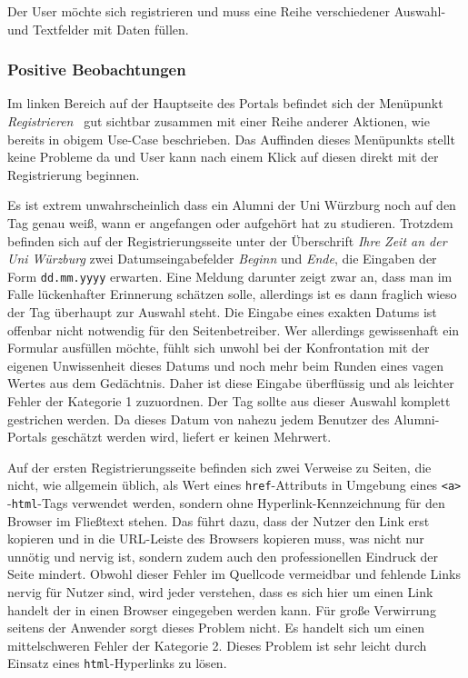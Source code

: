 \newpage
{}\label{usecse:reg}
Der User möchte sich registrieren und muss eine Reihe verschiedener Auswahl- und Textfelder mit Daten füllen.

\subsubsection*{Positive Beobachtungen} 
Im linken Bereich auf der Hauptseite des Portals befindet sich der Menüpunkt \emph{ Registrieren} ~gut sichtbar zusammen mit einer Reihe anderer Aktionen, wie bereits in obigem Use-Case beschrieben. Das Auffinden dieses Menüpunkts stellt keine Probleme da und User kann nach einem Klick auf diesen direkt mit der Registrierung
beginnen.




{ Es ist extrem unwahrscheinlich dass ein Alumni der Uni Würzburg noch auf den Tag genau weiß, wann er angefangen oder aufgehört hat zu studieren. Trotzdem befinden sich auf
der Registrierungsseite unter der Überschrift \emph{Ihre Zeit an der Uni Würzburg} zwei Datumseingabefelder \emph{Beginn} und \emph{Ende}, die Eingaben der Form \texttt{dd.mm.yyyy} erwarten.
}
{
Eine Meldung darunter zeigt zwar an, dass man im Falle lückenhafter Erinnerung schätzen solle, allerdings ist es dann fraglich wieso der Tag überhaupt zur Auswahl steht. Die Eingabe eines exakten Datums ist offenbar nicht notwendig für den Seitenbetreiber. Wer allerdings gewissenhaft ein Formular ausfüllen möchte, fühlt sich unwohl bei der Konfrontation mit der eigenen Unwissenheit dieses Datums und noch mehr beim Runden eines vagen Wertes aus dem Gedächtnis. Daher ist diese Eingabe überflüssig und als leichter Fehler der Kategorie 1 zuzuordnen.
}
{ Der Tag sollte aus dieser Auswahl komplett gestrichen werden. Da dieses Datum von nahezu jedem Benutzer des Alumni-Portals geschätzt werden wird, liefert er keinen Mehrwert.
} 
\label{prob:reg:wtfday}

{ Auf der ersten Registrierungsseite befinden sich zwei Verweise zu Seiten, die nicht, wie allgemein üblich, als Wert eines \texttt{href}-Attributs in Umgebung eines \texttt{\textless a\textgreater} -\texttt{html}-Tags verwendet werden, sondern ohne Hyperlink-Kennzeichnung für den Browser im Fließtext stehen. Das führt dazu, dass der Nutzer den Link erst kopieren und in die URL-Leiste des Browsers kopieren muss, was nicht nur unnötig und nervig ist, sondern zudem auch den professionellen Eindruck der Seite mindert.
}
{ Obwohl dieser Fehler im Quellcode vermeidbar und fehlende Links nervig für Nutzer sind, wird jeder verstehen, dass es sich hier um einen Link handelt der in einen Browser eingegeben werden kann. Für große Verwirrung seitens der Anwender sorgt dieses Problem nicht. Es handelt sich um einen mittelschweren Fehler der Kategorie 2.
}
{ Dieses Problem ist sehr leicht durch Einsatz eines \texttt{html}-Hyperlinks zu lösen.
} 
\label{prob:reg:hyperhyper}

